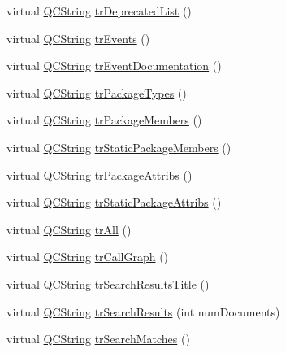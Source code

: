 \begin{DoxyCompactItemize}
\item 
virtual \mbox{\hyperlink{class_q_c_string}{Q\+C\+String}} \mbox{\hyperlink{class_translator_chinese_ad6459a83eadd7cbd8c41f9305f8983b3}{tr\+Deprecated\+List}} ()
\item 
virtual \mbox{\hyperlink{class_q_c_string}{Q\+C\+String}} \mbox{\hyperlink{class_translator_chinese_ad562702b2a77d308bb44fcb408687d8e}{tr\+Events}} ()
\item 
virtual \mbox{\hyperlink{class_q_c_string}{Q\+C\+String}} \mbox{\hyperlink{class_translator_chinese_ad0bb3e2015b491a3a396e7a526588ae2}{tr\+Event\+Documentation}} ()
\item 
virtual \mbox{\hyperlink{class_q_c_string}{Q\+C\+String}} \mbox{\hyperlink{class_translator_chinese_a25cae2f1f4bdf463655080cff7c362ef}{tr\+Package\+Types}} ()
\item 
virtual \mbox{\hyperlink{class_q_c_string}{Q\+C\+String}} \mbox{\hyperlink{class_translator_chinese_ae085517b705f2b4a3f41259dc5fedcb1}{tr\+Package\+Members}} ()
\item 
virtual \mbox{\hyperlink{class_q_c_string}{Q\+C\+String}} \mbox{\hyperlink{class_translator_chinese_a1089b9469259c2a3fcfe04d961d9a3df}{tr\+Static\+Package\+Members}} ()
\item 
virtual \mbox{\hyperlink{class_q_c_string}{Q\+C\+String}} \mbox{\hyperlink{class_translator_chinese_a50804b5ad74925daac9ddeda1ae7a10c}{tr\+Package\+Attribs}} ()
\item 
virtual \mbox{\hyperlink{class_q_c_string}{Q\+C\+String}} \mbox{\hyperlink{class_translator_chinese_aa7d7f9013d65ef116d02a1f0432d970b}{tr\+Static\+Package\+Attribs}} ()
\item 
virtual \mbox{\hyperlink{class_q_c_string}{Q\+C\+String}} \mbox{\hyperlink{class_translator_chinese_afd2eb843c56e0fe445ca53aaaf839c89}{tr\+All}} ()
\item 
virtual \mbox{\hyperlink{class_q_c_string}{Q\+C\+String}} \mbox{\hyperlink{class_translator_chinese_a3172cf3eaa766ff2474ccd25cada88da}{tr\+Call\+Graph}} ()
\item 
virtual \mbox{\hyperlink{class_q_c_string}{Q\+C\+String}} \mbox{\hyperlink{class_translator_chinese_ac651391a9c3735b824c3f07817b06051}{tr\+Search\+Results\+Title}} ()
\item 
virtual \mbox{\hyperlink{class_q_c_string}{Q\+C\+String}} \mbox{\hyperlink{class_translator_chinese_ac6f51e7506b05f8f1622b4070a992545}{tr\+Search\+Results}} (int num\+Documents)
\item 
virtual \mbox{\hyperlink{class_q_c_string}{Q\+C\+String}} \mbox{\hyperlink{class_translator_chinese_a29ca693833cf41be5cfcbc0f3711ff65}{tr\+Search\+Matches}} ()

\end{DoxyCompactItemize}
